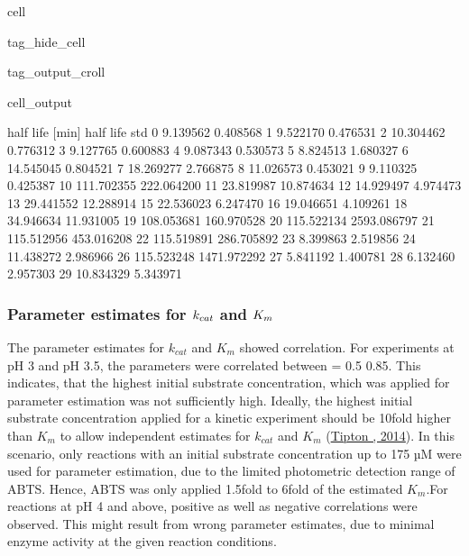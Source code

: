 \documentclass[letterpaper,12pt,english]{jupyterBook}
\begin{document}
\begin{sphinxuseclass}{cell}
\begin{sphinxuseclass}{tag_hide_cell}
\begin{sphinxuseclass}{tag_output_croll}
\begin{sphinxVerbatimOutput}
\begin{sphinxuseclass}{cell_output}
\begin{sphinxVerbatim}[commandchars=\\\{\}]
    half life [min]  half life std  
0          9.139562       0.408568  
1          9.522170       0.476531  
2         10.304462       0.776312  
3          9.127765       0.600883  
4          9.087343       0.530573  
5          8.824513       1.680327  
6         14.545045       0.804521  
7         18.269277       2.766875  
8         11.026573       0.453021  
9          9.110325       0.425387  
10       111.702355     222.064200  
11        23.819987      10.874634  
12        14.929497       4.974473  
13        29.441552      12.288914  
15        22.536023       6.247470  
16        19.046651       4.109261  
18        34.946634      11.931005  
19       108.053681     160.970528  
20       115.522134    2593.086797  
21       115.512956     453.016208  
22       115.519891     286.705892  
23         8.399863       2.519856  
24        11.438272       2.986966  
26       115.523248    1471.972292  
27         5.841192       1.400781  
28         6.132460       2.957303  
29        10.834329       5.343971  
\end{sphinxVerbatim}

\end{sphinxuseclass}\end{sphinxVerbatimOutput}

\end{sphinxuseclass}
\end{sphinxuseclass}
\end{sphinxuseclass}

\subsubsection{Parameter estimates for \protect\(k_{cat}\protect\) and \protect\(K_{m}\protect\)}
\label{\detokenize{scenarios/SLAC_kinetic_characterization:parameter-estimates-for-k-cat-and-k-m}}
\sphinxAtStartPar
The parameter estimates for \(k_{cat}\) and \(K_{m}\) showed correlation. For experiments at pH 3 and pH 3.5, the parameters were correlated between  = 0.5 \sphinxhyphen{} 0.85. This indicates, that the highest initial substrate concentration, which was applied for parameter estimation was not sufficiently high. Ideally, the highest initial substrate concentration applied for a kinetic experiment should be 10\sphinxhyphen{}fold higher than \(K_{m}\) to allow independent estimates for \(k_{cat}\) and \(K_{m}\) (\hyperlink{cite.references:id11}{Tipton , 2014}). In this scenario, only reactions with an initial substrate concentration up to 175 µM were used for parameter estimation, due to the limited photometric detection range of ABTS. Hence, ABTS was only applied 1.5\sphinxhyphen{}fold to 6\sphinxhyphen{}fold of the estimated \(K_{m}\).For reactions at pH 4 and above, positive as well as negative correlations were observed. This might result from wrong parameter estimates, due to minimal enzyme activity at the given reaction conditions.
\end{document}
